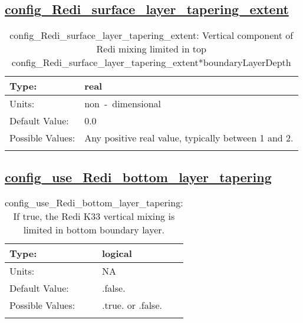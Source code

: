 \subsection[config\_Redi\_surface\_layer\_tapering\_extent]{\hyperref[sec:nm_tab_mesoscale_eddy_parameterization]{config\_Redi\_surface\_layer\_tapering\_extent}}
\label{subsec:nm_sec_config_Redi_surface_layer_tapering_extent}
\begin{center}
\begin{longtable}{| p{2.0in} || p{4.0in} |}
    \hline
    Type: & real \\
    \hline
    Units: & \si{non-dimensional} \\
    \hline
    Default Value: & 0.0 \\
    \hline
    Possible Values: & Any positive real value, typically between 1 and 2. \\
    \hline
    \caption{config\_Redi\_surface\_layer\_tapering\_extent: Vertical component of Redi mixing limited in top config\_Redi\_surface\_layer\_tapering\_extent*boundaryLayerDepth}
\end{longtable}
\end{center}
\subsection[config\_use\_Redi\_bottom\_layer\_tapering]{\hyperref[sec:nm_tab_mesoscale_eddy_parameterization]{config\_use\_Redi\_bottom\_layer\_tapering}}
\label{subsec:nm_sec_config_use_Redi_bottom_layer_tapering}
\begin{center}
\begin{longtable}{| p{2.0in} || p{4.0in} |}
    \hline
    Type: & logical \\
    \hline
    Units: & \si{NA} \\
    \hline
    Default Value: & .false. \\
    \hline
    Possible Values: & .true. or .false. \\
    \hline
    \caption{config\_use\_Redi\_bottom\_layer\_tapering: If true, the Redi K33 vertical mixing is limited in bottom boundary layer.}
\end{longtable}
\end{center}
